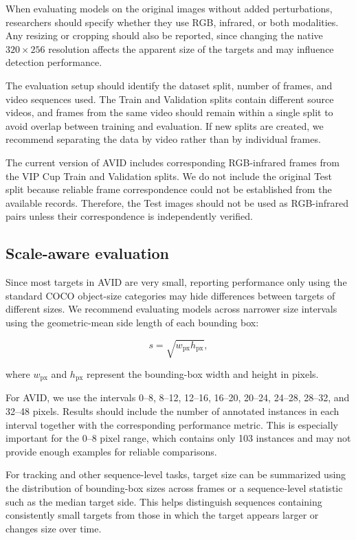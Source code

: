 \documentclass[10pt]{article}
\newcommand{\dataset}{\textsc{AVID}}
\begin{document}
When evaluating models on the original images without added perturbations, researchers should specify whether they use RGB, infrared, or both modalities. Any resizing or cropping should also be reported, since changing the native $320\times256$ resolution affects the apparent size of the targets and may influence detection performance.

The evaluation setup should identify the dataset split, number of frames, and video sequences used. The Train and Validation splits contain different source videos, and frames from the same video should remain within a single split to avoid overlap between training and evaluation. If new splits are created, we recommend separating the data by video rather than by individual frames.

The current version of \dataset{} includes corresponding RGB-infrared frames from the VIP Cup Train and Validation splits. We do not include the original Test split because reliable frame correspondence could not be established from the available records. Therefore, the Test images should not be used as RGB-infrared pairs unless their correspondence is independently verified.

\subsection{Scale-aware evaluation}

Since most targets in \dataset{} are very small, reporting performance only using the standard COCO object-size categories may hide differences between targets of different sizes. We recommend evaluating models across narrower size intervals using the geometric-mean side length of each bounding box:

\begin{equation}
s=\sqrt{w_{\mathrm{px}}h_{\mathrm{px}}},
\end{equation}

where $w_{\mathrm{px}}$ and $h_{\mathrm{px}}$ represent the bounding-box width and height in pixels.

For \dataset{}, we use the intervals 0--8, 8--12, 12--16, 16--20, 20--24, 24--28, 28--32, and 32--48 pixels. Results should include the number of annotated instances in each interval together with the corresponding performance metric. This is especially important for the 0--8 pixel range, which contains only 103 instances and may not provide enough examples for reliable comparisons.

For tracking and other sequence-level tasks, target size can be summarized using the distribution of bounding-box sizes across frames or a sequence-level statistic such as the median target side. This helps distinguish sequences containing consistently small targets from those in which the target appears larger or changes size over time.
\end{document}

